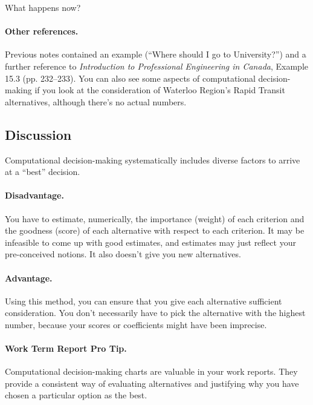 {\sf What happens now?}
\vspace{2em}

\paragraph{Other references.}
Previous notes contained an example (``Where should I go to
University?'') and a further reference to \emph{Introduction to
  Professional Engineering in Canada}, Example 15.3
(pp. 232--233). You can also see some aspects of computational
decision-making if you look at the consideration of Waterloo Region's
Rapid Transit alternatives, although there's no actual numbers.  

\subsection*{Discussion}
Computational decision-making systematically includes diverse factors
to arrive at a ``best'' decision.

\paragraph{Disadvantage.} You have to estimate, numerically, the 
importance (weight) of each criterion and the goodness (score) of each 
alternative with respect to each criterion. It may be infeasible to
come up with good estimates, and estimates may just reflect your
pre-conceived notions. It also doesn't give you new alternatives.

\paragraph{Advantage.} Using this method, you can ensure that you give
each alternative sufficient consideration. You don't necessarily have to
pick the alternative with the highest number, because your scores or
coefficients might have been imprecise.

\paragraph{Work Term Report Pro Tip.} Computational decision-making charts are valuable in your work reports. They provide a consistent way of evaluating alternatives and justifying why you have chosen a particular option as the best.



